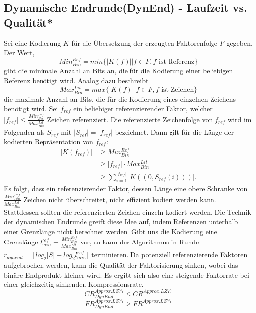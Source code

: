 \subsection{Dynamische Endrunde(DynEnd) - Laufzeit vs. Qualität*}
Sei eine Kodierung $K$ für die Übersetzung der erzeugten Faktorenfolge $F$ gegeben. Der Wert,
\begin{equation}
    Min^{Ref}_{Bin}=min\{|K(f)| | f \in F ,f \text{ ist Referenz}\}
\end{equation}
gibt die minimale Anzahl an Bits an, die für die Kodierung einer beliebigen Referenz benötigt wird. Analog dazu beschreibt
\begin{equation}
    Max^{Lit}_{Bin}=max\{|K(f)| | f \in F, f \text{ ist Zeichen}\}
\end{equation}
die maximale Anzahl an Bits, die für die Kodierung eines einzelnen Zeichens benötigt wird. Sei $f_{ref}$ ein beliebiger referenzierender Faktor, welcher 
$|f_{ref}|\leq\frac{Min^{Ref}_{Bin}}{Max^{Lit}_{Bin}}$ Zeichen referenziert. Die referenzierte Zeichenfolge von $f_{ref}$ wird im Folgenden als $S_{ref}$ mit $|S_{ref}|=|f_{ref}|$ bezeichnet.
Dann gilt für die Länge der kodierten Repräsentation von $f_{ref}$:
\begin{equation}
\begin{split}
    |K(f_{ref})| & \geq Min^{Ref}_{Bin}\\
    & \geq |f_{ref}| \cdot Max^{Lit}_{Bin}\\
    & \geq \sum_{i=1}^{|f_{ref}|} |K((0, S_{ref}(i)))|.
\end{split}
\end{equation}
Es folgt, dass ein referenzierender Faktor, dessen Länge eine obere Schranke von $\frac{Min^{Ref}_{Bin}}{Max^{Lit}_{Bin}}$ Zeichen nicht überschreitet, nicht effizient kodiert werden kann.
Stattdessen sollten die referenzierten Zeichen einzeln kodiert werden. Die Technik der dynamischen Endrunde greift diese Idee auf, indem Referenzen unterhalb einer Grenzlänge nicht berechnet
werden. Gibt uns die Kodierung eine Grenzlänge $l^{ref}_{min} = \frac{Min^{Ref}_{Bin}}{Max^{Lit}_{Bin}}$ vor, so kann der Algorithmus in Runde 
$r_{dynend} = \lceil log_2{|S|}-log_2{l^{ref}_{min}} \rceil$ terminieren. Da potenziell referenzierende Faktoren aufgebrochen werden, kann die Qualität der Faktorisierung sinken, wobei das 
binäre Endprodukt kleiner wird. Es ergibt sich also eine steigende Faktorrate bei einer gleichzeitig sinkenden Kompressionsrate.
\begin{equation}
    CR^{Approx.LZ77}_{DynEnd} \leq CR^{Approx.LZ77}
\end{equation}
\begin{equation}
    FR^{Approx.LZ77}_{DynEnd} \geq FR^{Approx.LZ77}
\end{equation}

